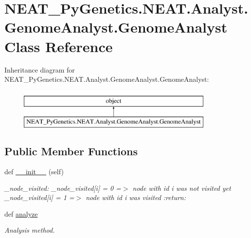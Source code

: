 \hypertarget{classNEAT__PyGenetics_1_1NEAT_1_1Analyst_1_1GenomeAnalyst_1_1GenomeAnalyst}{}\section{N\+E\+A\+T\+\_\+\+Py\+Genetics.\+N\+E\+A\+T.\+Analyst.\+Genome\+Analyst.\+Genome\+Analyst Class Reference}
\label{classNEAT__PyGenetics_1_1NEAT_1_1Analyst_1_1GenomeAnalyst_1_1GenomeAnalyst}
Inheritance diagram for N\+E\+A\+T\+\_\+\+Py\+Genetics.\+N\+E\+A\+T.\+Analyst.\+Genome\+Analyst.\+Genome\+Analyst\+:\begin{figure}[H]
\begin{center}
\leavevmode
\includegraphics[height=2.000000cm]{classNEAT__PyGenetics_1_1NEAT_1_1Analyst_1_1GenomeAnalyst_1_1GenomeAnalyst}
\end{center}
\end{figure}
\subsection*{Public Member Functions}
\begin{DoxyCompactItemize}
\item 
def \hyperlink{classNEAT__PyGenetics_1_1NEAT_1_1Analyst_1_1GenomeAnalyst_1_1GenomeAnalyst_a2b9e3334de517a0555177ee6bcc0ac04}{\+\_\+\+\_\+init\+\_\+\+\_\+} (self)
\begin{DoxyCompactList}\small\item\em \+\_\+node\+\_\+visited\+: \+\_\+node\+\_\+visited\mbox{[}i\mbox{]} = 0 =$>$ node with id i was not visited yet \+\_\+node\+\_\+visited\mbox{[}i\mbox{]} = 1 =$>$ node with id i was visited \+:return\+: \end{DoxyCompactList}\item 
def \hyperlink{classNEAT__PyGenetics_1_1NEAT_1_1Analyst_1_1GenomeAnalyst_1_1GenomeAnalyst_afdd3b4e6b0b8275dd62677b8d5a18933}{analyze}
\begin{DoxyCompactList}\small\item\em Analysis method. \end{DoxyCompactList}\end{DoxyCompactItemize}
